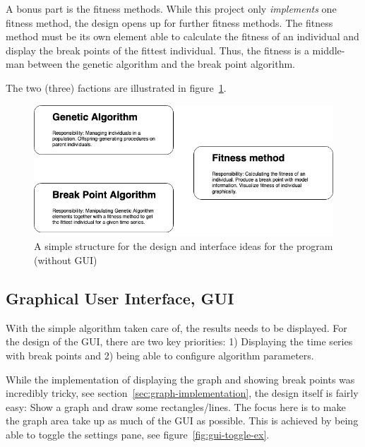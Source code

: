 A bonus part is the fitness methods. While this project only \textit{implements}
one fitness method, the design opens up for further fitness methods. The fitness
method must be its own element able to calculate the fitness of an individual
and display the break points of the fittest individual. Thus, the fitness is a
middle-man between the genetic algorithm and the break point algorithm. 

The two (three) factions are illustrated in
figure~\ref{fig:simple-design-structure}. 

\begin{figure}[ht]
    \centering
    \includegraphics[width=.8\textwidth]{fig/simple-design-structure.png}
    \caption{A simple structure for the design and interface ideas for the program (without GUI)}
    \label{fig:simple-design-structure}
\end{figure}



\subsection{Graphical User Interface, GUI} \label{sec:gui-design}

With the simple algorithm taken care of, the results needs to be displayed. For 
the design of the GUI, there are two key priorities: 1) Displaying the time
series with break points and 2) being able to configure algorithm parameters. 

While the implementation of displaying the graph and showing break points was incredibly tricky, see
section~\ref{sec:graph-implementation}, the design itself is fairly easy: Show a
graph and draw some rectangles/lines. The focus here is to make the graph area
take up as much of the GUI as possible. This is achieved by being able to toggle
the settings pane, see figure~\ref{fig:gui-toggle-ex}. 


